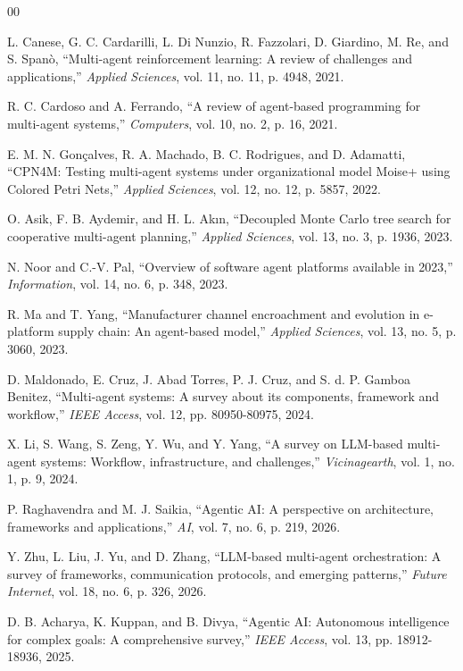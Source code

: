 \documentclass[conference]{IEEEtran}
\begin{document}
\begin{thebibliography}{00}

L. Canese, G. C. Cardarilli, L. Di Nunzio, R. Fazzolari, D. Giardino, M. Re, and S. Span\`o, ``Multi-agent reinforcement learning: A review of challenges and applications,'' \textit{Applied Sciences}, vol. 11, no. 11, p. 4948, 2021.

R. C. Cardoso and A. Ferrando, ``A review of agent-based programming for multi-agent systems,'' \textit{Computers}, vol. 10, no. 2, p. 16, 2021.

E. M. N. Gon\c{c}alves, R. A. Machado, B. C. Rodrigues, and D. Adamatti, ``CPN4M: Testing multi-agent systems under organizational model Moise+ using Colored Petri Nets,'' \textit{Applied Sciences}, vol. 12, no. 12, p. 5857, 2022.

O. Asik, F. B. Aydemir, and H. L. Ak{\i}n, ``Decoupled Monte Carlo tree search for cooperative multi-agent planning,'' \textit{Applied Sciences}, vol. 13, no. 3, p. 1936, 2023.

N. Noor and C.-V. Pal, ``Overview of software agent platforms available in 2023,'' \textit{Information}, vol. 14, no. 6, p. 348, 2023.

R. Ma and T. Yang, ``Manufacturer channel encroachment and evolution in e-platform supply chain: An agent-based model,'' \textit{Applied Sciences}, vol. 13, no. 5, p. 3060, 2023.

D. Maldonado, E. Cruz, J. Abad Torres, P. J. Cruz, and S. d. P. Gamboa Benitez, ``Multi-agent systems: A survey about its components, framework and workflow,'' \textit{IEEE Access}, vol. 12, pp. 80950-80975, 2024.

X. Li, S. Wang, S. Zeng, Y. Wu, and Y. Yang, ``A survey on LLM-based multi-agent systems: Workflow, infrastructure, and challenges,'' \textit{Vicinagearth}, vol. 1, no. 1, p. 9, 2024.

P. Raghavendra and M. J. Saikia, ``Agentic AI: A perspective on architecture, frameworks and applications,'' \textit{AI}, vol. 7, no. 6, p. 219, 2026.

Y. Zhu, L. Liu, J. Yu, and D. Zhang, ``LLM-based multi-agent orchestration: A survey of frameworks, communication protocols, and emerging patterns,'' \textit{Future Internet}, vol. 18, no. 6, p. 326, 2026.

D. B. Acharya, K. Kuppan, and B. Divya, ``Agentic AI: Autonomous intelligence for complex goals: A comprehensive survey,'' \textit{IEEE Access}, vol. 13, pp. 18912-18936, 2025.


\end{thebibliography}
\end{document}
